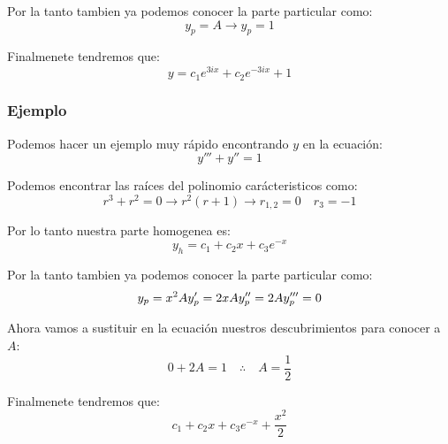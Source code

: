 \documentclass[12pt]{report}                                %
\begin{document}
            Por la tanto tambien ya podemos conocer la parte particular como:
            \begin{equation*}
                y_p = A \to y_p = 1
            \end{equation*}

            Finalmenete tendremos que:
            \begin{equation*}
                y = c_1 e^{3ix} + c_2 e^{-3ix} + 1
            \end{equation*}

        \clearpage
        \subsubsection{Ejemplo}
            Podemos hacer un ejemplo muy rápido encontrando $y$ en la ecuación:
            \begin{equation*}
                y''' + y'' = 1
            \end{equation*}

            Podemos encontrar las raíces del polinomio carácteristicos como:
            \begin{equation*}
                r^3 + r^2 = 0 \to r^2(r+1) \to r_{1,2} = 0  \quad r_{3} = -1 
            \end{equation*}

            Por lo tanto nuestra parte homogenea es:
            \begin{equation*}
                y_h = c_1 + c_2x + c_3e^{-x}
            \end{equation*}

            Por la tanto tambien ya podemos conocer la parte particular como:
            \begin{equation*}
                y_p   = x^2A \\
                y_p'  = 2xA  \\
                y_p'' = 2A   \\
                y_p'''= 0   
            \end{equation*}

            Ahora vamos a sustituir en la ecuación nuestros descubrimientos para conocer a $A$:
            \begin{equation*}
                0 + 2A = 1 \quad \therefore \quad A = \frac{1}{2}
            \end{equation*}

            Finalmenete tendremos que:
            \begin{equation*}
                c_1 + c_2x + c_3e^{-x} + \frac{x^2}{2}
            \end{equation*}
\end{document}
